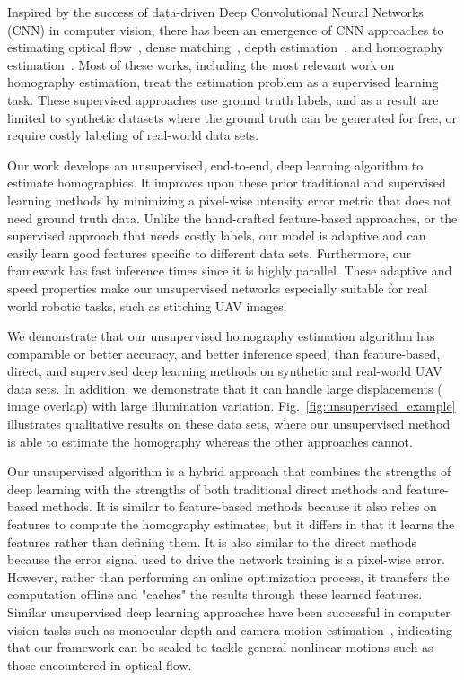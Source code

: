 \documentclass[letterpaper, 10 pt, conference]{ieeeconf}
\begin{document}
Inspired by the success of data-driven Deep Convolutional Neural Networks (CNN) in computer vision, there has been an emergence of CNN approaches to estimating optical flow~\cite{weinzaepfel2013deepflow,ilg2016flownet,fischer2015flownet}, dense matching~\cite{revaud2016deepmatching,altwaijry2016learning}, depth estimation~\cite{eigen2014depth}, and homography estimation~\cite{detone2016}. Most of these works, including the most relevant work on homography estimation, treat the estimation problem as a supervised learning task. These supervised approaches use ground truth labels, and as a result are limited to synthetic datasets where the ground truth can be generated for free, or require costly labeling of real-world data sets. 

Our work develops an unsupervised, end-to-end, deep learning algorithm to estimate homographies. It improves upon these prior traditional and supervised learning methods by minimizing a pixel-wise intensity error metric that does not need ground truth data. Unlike the hand-crafted feature-based approaches, or the supervised approach that needs costly labels, our model is adaptive and can easily learn good features specific to different data sets. Furthermore, our framework has fast inference times since it is highly parallel. These adaptive and speed properties make our unsupervised networks especially suitable for real world robotic tasks, such as stitching UAV images. 

We demonstrate that our unsupervised homography estimation algorithm has comparable or better accuracy, and better inference speed, than feature-based, direct, and supervised deep learning methods on synthetic and real-world UAV data sets. In addition, we demonstrate that it can handle large displacements ( image overlap) with large illumination variation. Fig.~\ref{fig:unsupervised_example} illustrates qualitative results on these data sets, where our unsupervised method is able to estimate the homography whereas the other approaches cannot.

Our unsupervised algorithm is a hybrid approach that combines the strengths of deep learning with the strengths of both traditional direct methods and feature-based methods. It is similar to feature-based methods because it also relies on features to compute the homography estimates, but it differs in that it learns the features rather than defining them. It is also similar to the direct methods because the error signal used to drive the network training is a pixel-wise error. However, rather than performing an online optimization process, it transfers the computation offline and "caches" the results through these learned features. Similar unsupervised deep learning approaches have been successful in computer vision tasks such as monocular depth and camera motion estimation~\cite{zhou2017unsupervised}, indicating that our framework can be scaled to tackle general nonlinear motions such as those encountered in optical flow.
\end{document}
